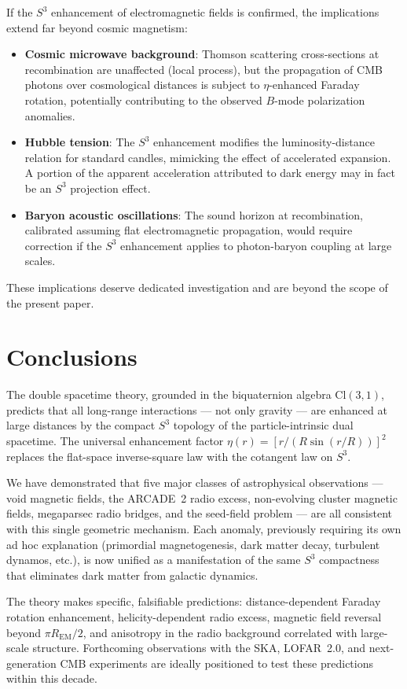 \documentclass[a4paper]{article}
\begin{document}
If the $S^3$ enhancement of electromagnetic fields is confirmed, the
implications extend far beyond cosmic magnetism:
\begin{itemize}
\item \textbf{Cosmic microwave background}: Thomson scattering cross-sections
  at recombination are unaffected (local process), but the propagation of CMB
  photons over cosmological distances is subject to $\eta$-enhanced Faraday
  rotation, potentially contributing to the observed $B$-mode polarization
  anomalies.
\item \textbf{Hubble tension}: The $S^3$ enhancement modifies the
  luminosity-distance relation for standard candles, mimicking the effect of
  accelerated expansion. A portion of the apparent acceleration attributed to
  dark energy may in fact be an $S^3$ projection effect.
\item \textbf{Baryon acoustic oscillations}: The sound horizon at
  recombination, calibrated assuming flat electromagnetic propagation, would
  require correction if the $S^3$ enhancement applies to photon-baryon coupling
  at large scales.
\end{itemize}
These implications deserve dedicated investigation and are beyond the scope of
the present paper.

\section{Conclusions}
\label{sec:conclusions}

The double spacetime theory, grounded in the biquaternion algebra
$\mathrm{Cl}(3,1)$, predicts that all long-range interactions --- not only
gravity --- are enhanced at large distances by the compact $S^3$ topology of the
particle-intrinsic dual spacetime. The universal enhancement factor
$\eta(r) = [r/(R\sin(r/R))]^2$ replaces the flat-space inverse-square law with
the cotangent law on $S^3$.

We have demonstrated that five major classes of astrophysical observations ---
void magnetic fields, the ARCADE~2 radio excess, non-evolving cluster magnetic
fields, megaparsec radio bridges, and the seed-field problem --- are all
consistent with this single geometric mechanism. Each anomaly, previously
requiring its own ad hoc explanation (primordial magnetogenesis, dark matter
decay, turbulent dynamos, etc.), is now unified as a manifestation of the same
$S^3$ compactness that eliminates dark matter from galactic dynamics.

The theory makes specific, falsifiable predictions: distance-dependent Faraday
rotation enhancement, helicity-dependent radio excess, magnetic field reversal
beyond $\pi R_{\text{EM}}/2$, and anisotropy in the radio background correlated
with large-scale structure. Forthcoming observations with the SKA, LOFAR~2.0,
and next-generation CMB experiments are ideally positioned to test these
predictions within this decade.
\end{document}
